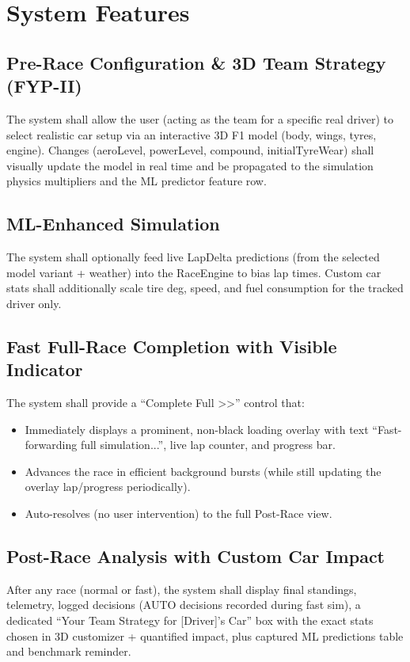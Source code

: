\documentclass[12pt,a4paper]{article}
\begin{document}
\section{System Features}
\subsection{Pre-Race Configuration \& 3D Team Strategy (FYP-II)}
The system shall allow the user (acting as the team for a specific real driver) to select realistic car setup via an interactive 3D F1 model (body, wings, tyres, engine). Changes (aeroLevel, powerLevel, compound, initialTyreWear) shall visually update the model in real time and be propagated to the simulation physics multipliers and the ML predictor feature row.

\subsection{ML-Enhanced Simulation}
The system shall optionally feed live LapDelta predictions (from the selected model variant + weather) into the RaceEngine to bias lap times. Custom car stats shall additionally scale tire deg, speed, and fuel consumption for the tracked driver only.

\subsection{Fast Full-Race Completion with Visible Indicator}
The system shall provide a ``Complete Full >>'' control that:
\begin{itemize}
\item Immediately displays a prominent, non-black loading overlay with text ``Fast-forwarding full simulation...'', live lap counter, and progress bar.
\item Advances the race in efficient background bursts (while still updating the overlay lap/progress periodically).
\item Auto-resolves (no user intervention) to the full Post-Race view.
\end{itemize}

\subsection{Post-Race Analysis with Custom Car Impact}
After any race (normal or fast), the system shall display final standings, telemetry, logged decisions (AUTO decisions recorded during fast sim), a dedicated ``Your Team Strategy for [Driver]'s Car'' box with the exact stats chosen in 3D customizer + quantified impact, plus captured ML predictions table and benchmark reminder.
\end{document}
